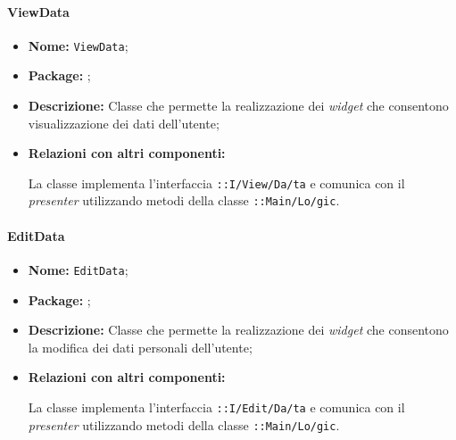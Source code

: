 \paragraph{ViewData}
\begin{flushleft}
\begin{itemize}
\item \textbf{Nome:} \texttt{ViewData};
\item \textbf{Package:} \texttt{\viewAdmin{}};
\item \textbf{Descrizione:} Classe che permette la realizzazione dei \textit{widget} che consentono visualizzazione dei dati dell'utente;
\item \textbf{Relazioni con altri componenti:}
\begin{sloppypar}
La classe implementa l'interfaccia \texttt{\iViewUser{}::I\fshyp{}View\fshyp{}Da\fshyp{}ta} e comunica con il \textit{presenter} utilizzando metodi della classe \texttt{\logicUser{}::Main\fshyp{}Lo\fshyp{}gic}.
\end{sloppypar}
\end{itemize}
\end{flushleft}

\paragraph{EditData}
\begin{flushleft}
\begin{itemize}
\item \textbf{Nome:} \texttt{EditData};
\item \textbf{Package:} \texttt{\viewAdmin{}};
\item \textbf{Descrizione:} Classe che permette la realizzazione dei \textit{widget} che consentono la modifica dei dati personali dell'utente;
\item \textbf{Relazioni con altri componenti:}
\begin{sloppypar}
La classe implementa l'interfaccia \texttt{\iViewUser{}::I\fshyp{}Edit\fshyp{}Da\fshyp{}ta} e comunica con il \textit{presenter} utilizzando metodi della classe \texttt{\logicUser{}::Main\fshyp{}Lo\fshyp{}gic}.
\end{sloppypar}
\end{itemize}
\end{flushleft}

